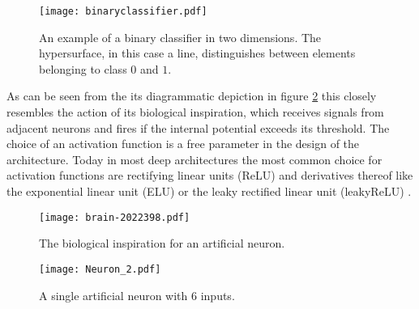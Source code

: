 \begin{figure}[H]
\centering
  \texttt{[image: binaryclassifier.pdf]}
  \caption{An example of a binary classifier in two dimensions. The hypersurface, in this case a line, distinguishes between elements belonging to class $0$ and $1$.}
  \label{fig:binaryclassifier}
\end{figure}

As can be seen from the its diagrammatic depiction in figure \ref{fig:Neuron} this closely resembles the action of its biological inspiration, which receives signals from adjacent neurons and fires if the internal potential exceeds its threshold.
The choice of an activation function is a free parameter in the design of the architecture. Today in most deep architectures the most common choice for activation functions are rectifying linear units (ReLU) and derivatives thereof like the exponential linear unit (ELU) \cite{Clevert2015} or the leaky rectified linear unit (leakyReLU) \cite{Maas2013}.

\begin{figure}[H]
\centering
  \texttt{[image: brain-2022398.pdf]}
  \caption{The biological inspiration for an artificial neuron.}
  \label{fig:Neuron}
  \texttt{[image: Neuron\_2.pdf]}
  \caption{A single artificial neuron with $6$ inputs.}
  \label{fig:Neuron}
\end{figure}



